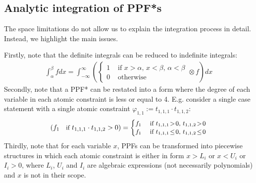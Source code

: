 \documentclass{article}
\newcommand{\case}[2]{#2 &\text{ if } #1}%
\newcommand{\otherwise}[1]{#1 &\text{ otherwise}}
\begin{document}
\subsection{Analytic integration of PPF*s}
The space limitations do not allow us to explain the integration process in detail. 
Instead, we highlight the main issues.

Firstly, note that the definite integrals can be reduced to indefinite integrals:
{
\footnotesize
\begin{align*}
\int_{\alpha}^{\beta} f dx  = 
\int_{-\infty}^{\infty}
\left (
  \begin{cases}
  \case{x\!>\!\alpha,\, x\!<\!\beta,\, \alpha \!<\! \beta}{1}\\
 \otherwise{0}    
  \end{cases}
\otimes
  f
\right)
dx
\end{align*}
}
Secondly, note that a PPF* can be restated into a form where
the degree of each variable in each atomic constraint is less or equal to 4.
E.g. consider a single case statement with a single atomic constraint 
$\varphi_{1,1} := t_{1,1,1} \cdot t_{1,1,2}$:%
\begin{align*}
{\footnotesize
\left(
f_1 \quad \text{if } t_{1,1,1} \cdot t_{1,1,2} > 0
\right)
 =
\begin{cases}
  \case{t_{1,1,1} \!>\! 0, \, t_{1,1,2} \!>\! 0 }{f_1} \\ 
  \case{t_{1,1,1} \!\leq\! 0, \, t_{1,1,2} \!\leq\! 0 }{f_1} 
 \end{cases} 
}
\end{align*}
Thirdly, note that for each variable $x$, 
PPFs can be transformed into piecewise structures 
in which each atomic constraint is either in form $x>L_i$ or $x<U_i$ or $I_i>0$, 
where $L_i$, $U_i$ and $I_i$ are 
algebraic expressions (not necessarily polynomials) and $x$ is not in their scope. 
\end{document}
